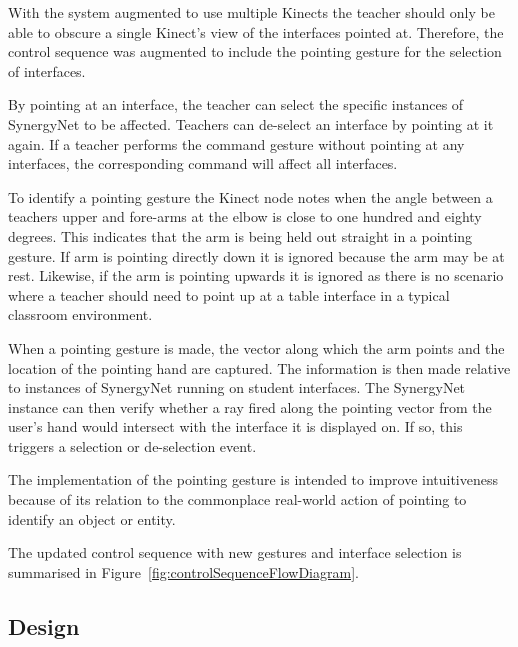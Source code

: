 \documentclass[link]{IWCOMP}
\begin{document}
With the system augmented to use multiple Kinects the teacher should only be able to obscure a single Kinect's view of the interfaces pointed at.
Therefore, the control sequence was augmented to include the pointing gesture for the selection of interfaces.

By pointing at an interface, the teacher can select the specific instances of SynergyNet to be affected.
Teachers can de-select an interface by pointing at it again.
If a teacher performs the command gesture without pointing at any interfaces, the corresponding command will affect all interfaces.

To identify a pointing gesture the Kinect node notes when the angle between a teachers upper and fore-arms at the elbow is close to one hundred and eighty degrees.
This indicates that the arm is being held out straight in a pointing gesture.
If arm is pointing directly down it is ignored because the arm may be at rest.
Likewise, if the arm is pointing upwards it is ignored as there is no scenario where a teacher should need to point up at a table interface in a typical classroom environment.

When a pointing gesture is made, the vector along which the arm points and the location of the pointing hand are captured.
The information is then made relative to instances of SynergyNet running on student interfaces.
The SynergyNet instance can then verify whether a ray fired along the pointing vector from the user's hand would intersect with the interface it is displayed on.
If so, this triggers a selection or de-selection event.

The implementation of the pointing gesture is intended to improve intuitiveness because of its relation to the commonplace real-world action of pointing to identify an object or entity.

The updated control sequence with new gestures and interface selection is summarised in Figure~\ref{fig:controlSequenceFlowDiagram}.

\subsection{Design}
\label{subsec:studyPhase2Design}

\end{document}
